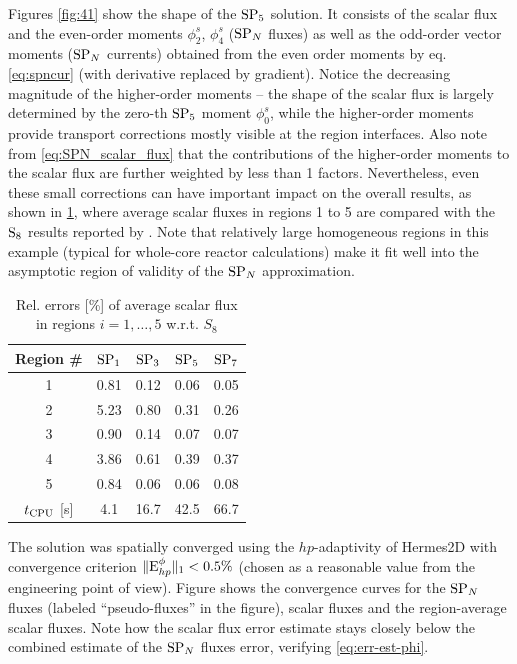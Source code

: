 Figures \ref{fig:41} show the shape of the $\SPN[5]$ solution. It consists of the scalar
flux and the even-order moments $\phi^s_2$, $\phi^s_4$ ($\SPN$ fluxes) as well as the odd-order vector moments ($\SPN$
currents) obtained from the even order moments by eq. \eqref{eq:spncur} (with derivative replaced by gradient).
Notice the decreasing magnitude of the higher-order moments -- the shape of the scalar flux is largely determined by the
zero-th $\SPN[5]$ moment $\phi^s_0$, while the higher-order moments provide transport corrections mostly visible at the region interfaces. Also note from \eqref{eq:SPN_scalar_flux} that the contributions of the higher-order moments to the scalar
flux are further weighted by less than 1 factors. Nevertheless, even these small corrections can have important impact
on the overall results, as shown in \ref{tab:IAEA}, where average scalar fluxes in regions 1 to 5 are compared with the
$\SN[8]$ results reported by \cite{Coppa1}. Note that relatively large homogeneous regions in this example (typical for
whole-core reactor calculations) make it fit well into the asymptotic region of validity of the $\SPN$ approximation.

\begin{table}
\centering
\begin{tabular}{c|cccc}
		Region \# & $\SPN[1]$ & $\SPN[3]$ & $\SPN[5]$ & $\SPN[7]$ \\\hline
		1   & 0.81 & 0.12 & 0.06 & 0.05 \\[.2em] 
		2   & 5.23 & 0.80 & 0.31 & 0.26 \\[.2em] 
		3   & 0.90 & 0.14 & 0.07 & 0.07 \\[.2em] 
		4   & 3.86 & 0.61 & 0.39 & 0.37 \\[.2em] 
		5   & 0.84 & 0.06 & 0.06 & 0.08 \\[.2em]\hline
		$t_{\mbox{\scriptsize CPU}}$ [s] & 4.1 & 16.7 & 42.5 & 66.7  
	\end{tabular} 
\caption[$\text{SP}_{5}$ vs. $\text{S}_{8}$ on the IAEA EIR-1 benchmark] {Rel. errors [\%] of average scalar flux in
regions $i=1,\ldots,5$ w.r.t. $S_8$}
\label{tab:IAEA}
\end{table}

The solution was spatially converged using the $hp$-adaptivity of Hermes2D with convergence criterion
$\norm[1]{\Ehp^{\phi}} < 0.5\%$ (chosen as a reasonable value from the engineering point of view). Figure 
shows the convergence curves for the $\SPN$ fluxes (labeled ``pseudo-fluxes'' in the figure), scalar fluxes and the
region-average scalar fluxes. Note how the scalar flux error estimate stays closely below the combined estimate of the
$\SPN$ fluxes error, verifying \eqref{eq:err-est-phi}.

